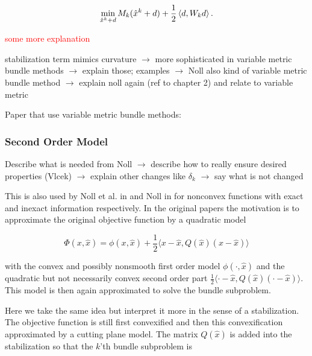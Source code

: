 \begin{equation*}
	\min_{\hat{x}^k+d} M_k(\hat{x}^k+d)+\frac{1}{2}\left\langle d,W_kd \right\rangle.
\end{equation*}

\textcolor{red}{some more explanation}

stabilization term mimics curvature \(\to\) more sophisticated in variable metric bundle methods \(\to\) explain those; examples \(\to\) Noll also kind of variable metric bundle method \(\to\) explain noll again (ref to chapter 2) and relate to variable metric

Paper that use variable metric bundle methods: \cite{Lemarechal1994,Lemarechal1997,Haarala2007,Vlcek2001}

\subsubsection{Second Order Model}


Describe what is needed from Noll \(\to\) describe how to really ensure desired properties (Vlcek) \(\to\) explain other changes like \(\delta_k\) \(\to\) say what is not changed








This is also used by Noll et al. in \cite{Noll2012} and Noll in \cite{Noll2013} for nonconvex functions with exact and inexact information respectively.
In the original papers the motivation is to approximate the original objective function by a quadratic model

\begin{equation}
	\Phi(x,\hat{x}) = \phi(x,\hat{x})+\frac{1}{2}\langle x-\hat{x},Q(\hat{x})(x-\hat{x})\rangle
\end{equation}

with the convex and possibly nonsmooth first order model \(\phi(\cdot,\hat{x})\) and the quadratic but not necessarily convex second order part \(\frac{1}{2}\langle \cdot-\hat{x},Q(\hat{x})(\cdot-\hat{x})\rangle\).
This model is then again approximated to solve the bundle subproblem.

Here we take the same idea but interpret it more in the sense of a stabilization. The objective function is still first convexified and then this convexification approximated by a cutting plane model. The matrix \(Q(\hat{x})\) is added into the stabilization so that the \(k\)'th bundle subproblem is

